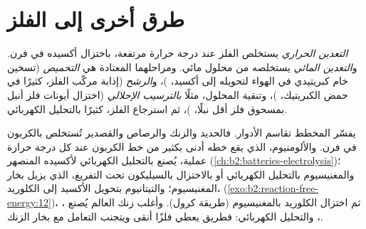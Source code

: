 \section{طرق أخرى إلى الفلز}

\begin{definition}\label{def:b2:ellingham:metallurgy}
\emph{التعدين الحراري} يستخلص الفلز عند درجة حرارة
مرتفعة، باختزال أكسيده في فرن. و\emph{التعدين المائي}
يستخلصه من محلول مائي. ومراحلهما المعتادة هي
\emph{التحميص} (تسخين خام كبريتيدي في الهواء لتحويله إلى
أكسيد، )، و\emph{الرشح}
(إذابة مركّب الفلز، كثيرًا في حمض الكبريتيك، )، وتنقية المحلول، مثلًا
\emph{بالترسيب الإحلالي} (اختزال أيونات فلز أنبل
بمسحوق فلز أقل نبلًا، )، ثم
استرجاع الفلز، كثيرًا بالتحليل الكهربائي.
\end{definition}

يفسّر المخطط تقاسم الأدوار. فالحديد والزنك والرصاص والقصدير تُستخلص
بالكربون في فرن. والألومنيوم، الذي يقع خطه أدنى بكثير من خط الكربون عند كل
درجة حرارة عملية، يُصنع بالتحليل الكهربائي لأكسيده المنصهر
(\cref{ch:b2:batteries-electrolysis})؛ والمغنيسيوم بالتحليل الكهربائي أو
بالاختزال بالسيليكون تحت التفريغ، الذي يزيل بخار المغنيسيوم؛
والتيتانيوم بتحويل الأكسيد إلى الكلوريد،  (\cref{exo:b2:reaction-free-energy:12})، ثم اختزال الكلوريد
بالمغنيسيوم (طريقة كرول). وأغلب زنك العالم يُصنع ،
، والتحليل الكهربائي: فطريق  يعطي فلزًا أنقى
ويتجنب التعامل مع بخار الزنك.

